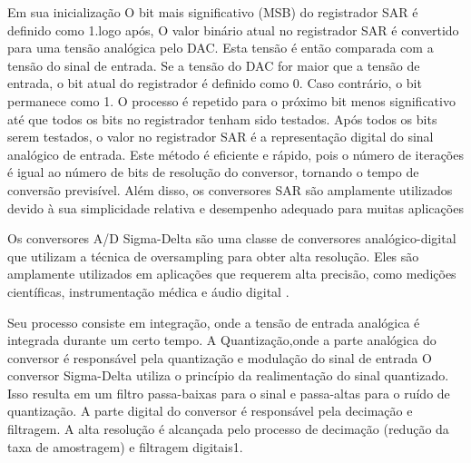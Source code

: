 Em sua inicialização  O bit mais significativo (MSB) do registrador SAR é definido como 1.logo após, O valor binário atual no registrador SAR é convertido para uma tensão analógica pelo DAC. Esta tensão é então comparada com a tensão do sinal de entrada.  Se a tensão do DAC for maior que a tensão de entrada, o bit atual do registrador é definido como 0. Caso contrário, o bit permanece como 1. O processo é repetido para o próximo bit menos significativo até que todos os bits no registrador tenham sido testados. Após todos os bits serem testados, o valor no registrador SAR é a representação digital do sinal analógico de entrada. Este método é eficiente e rápido, pois o número de iterações é igual ao número de bits de resolução do conversor, tornando o tempo de conversão previsível. Além disso, os conversores SAR são amplamente utilizados devido à sua simplicidade relativa e desempenho adequado para muitas aplicações

Os conversores A/D Sigma-Delta são uma classe de conversores analógico-digital que utilizam a técnica de oversampling para obter alta resolução. Eles são amplamente utilizados em aplicações que requerem alta precisão, como medições científicas, instrumentação médica e áudio digital \cite{sigma_delta}.

Seu processo consiste em integração, onde a tensão de entrada analógica é integrada durante um certo tempo. A Quantização,onde a parte analógica do conversor é responsável pela quantização e modulação do sinal de entrada  O conversor Sigma-Delta utiliza o princípio da realimentação do sinal quantizado. Isso resulta em um filtro passa-baixas para o sinal e passa-altas para o ruído de quantização. A parte digital do conversor é responsável pela decimação e filtragem. A alta resolução é alcançada pelo processo de decimação (redução da taxa de amostragem) e filtragem digitais1.
